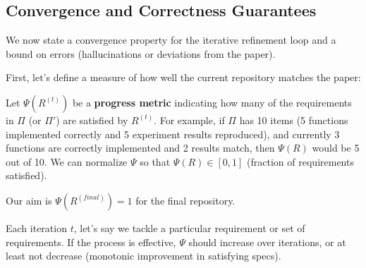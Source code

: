 \documentclass{ieeeaccess}
\begin{document}
\subsection{Convergence and Correctness Guarantees}
We now state a convergence property for the iterative refinement loop and a bound on errors (hallucinations or deviations from the paper).

First, let's define a measure of how well the current repository matches the paper:

Let $\Psi(R^{(t)})$ be a \textbf{progress metric} indicating how many of the requirements in $\Pi$ (or $\Pi'$) are satisfied by $R^{(t)}$. For example, if $\Pi$ has 10 items (5 functions implemented correctly and 5 experiment results reproduced), and currently 3 functions are correctly implemented and 2 results match, then $\Psi(R)$ would be 5 out of 10. We can normalize $\Psi$ so that $\Psi(R) \in [0,1]$ (fraction of requirements satisfied).

Our aim is $\Psi(R^{(final)}) = 1$ for the final repository.

Each iteration $t$, let's say we tackle a particular requirement or set of requirements. If the process is effective, $\Psi$ should increase over iterations, or at least not decrease (monotonic improvement in satisfying specs).
\end{document}
